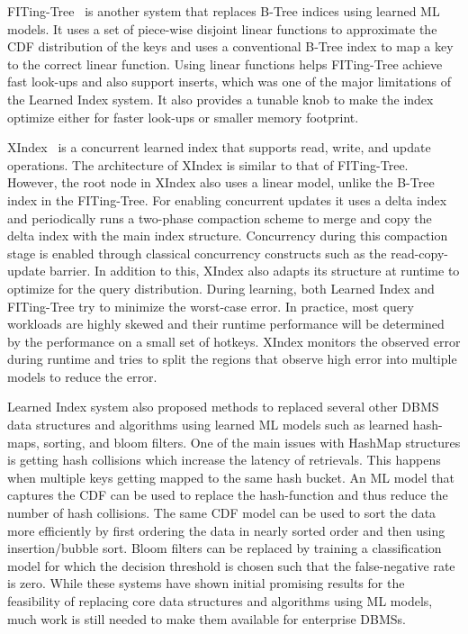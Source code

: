 FITing-Tree~\cite{fitingtree} is another system that replaces B-Tree indices using learned ML models.
It uses a set of piece-wise disjoint linear functions to approximate the CDF distribution of the keys and uses a conventional B-Tree index to map a key to the correct linear function.
Using linear functions helps FITing-Tree achieve fast look-ups and also support inserts, which was one of the major limitations of the Learned Index system.
It also provides a tunable knob to make the index optimize either for faster look-ups or smaller memory footprint.

XIndex~\cite{xindex} is a concurrent learned index that supports read, write, and update operations.
The architecture of XIndex is similar to that of FITing-Tree.
However, the root node in XIndex also uses a linear model, unlike the B-Tree index in the FITing-Tree.
For enabling concurrent updates it uses a delta index and periodically runs a two-phase compaction scheme to merge and copy the delta index with the main index structure.
Concurrency during this compaction stage is enabled through classical concurrency constructs such as the read-copy-update barrier.
In addition to this, XIndex also adapts its structure at runtime to optimize for the query distribution.
During learning, both Learned Index and FITing-Tree try to minimize the worst-case error.
In practice, most query workloads are highly skewed and their runtime performance will be determined by the performance on a small set of hotkeys.
XIndex monitors the observed error during runtime and tries to split the regions that observe high error into multiple models to reduce the error.

Learned Index system also proposed methods to replaced several other DBMS data structures and algorithms using learned ML models such as learned hash-maps, sorting, and bloom filters.
One of the main issues with HashMap structures is getting hash collisions which increase the latency of retrievals.
This happens when multiple keys getting mapped to the same hash bucket.
An ML model that captures the CDF can be used to replace the hash-function and thus reduce the number of hash collisions.
The same CDF model can be used to sort the data more efficiently by first ordering the data in nearly sorted order and then using insertion/bubble sort.
Bloom filters can be replaced by training a classification model for which the decision threshold is chosen such that the false-negative rate is zero.
While these systems have shown initial promising results for the feasibility of replacing core data structures and algorithms using ML models, much work is still needed to make them available for enterprise DBMSs.